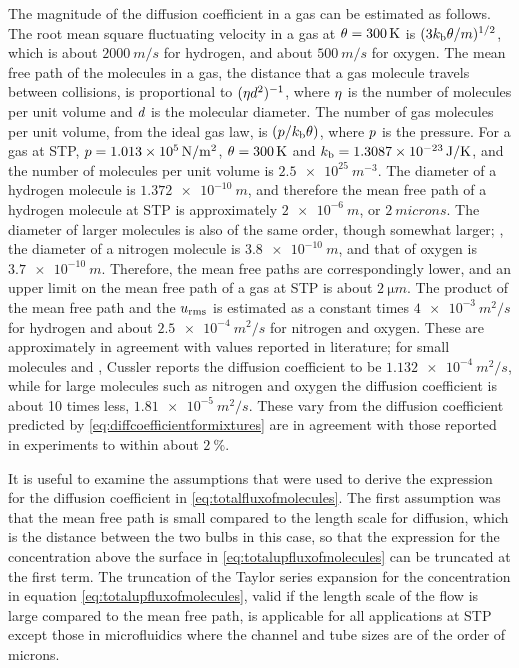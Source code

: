The magnitude of the diffusion coefficient in a gas can be estimated as follows. The root mean square fluctuating velocity in a gas at $\theta = \SI{300}{K}$ is $(3k_\text{b}\theta/m)^{1/2}$, which is about $\SI{2000}{m/s}$ for hydrogen, and about $\SI{500}{m/s}$ for oxygen. The mean free path of the molecules in a gas, the distance that a gas molecule travels between collisions, is proportional to $(\eta d^2)^{-1}$, where $\eta$ is the number of molecules per unit volume and $d$ is the molecular diameter. The number of gas molecules per unit volume, from the ideal gas law, is $(p/k_\text{b}\theta)$, where $p$ is the pressure. For a gas at STP, $p = \SI{1.013e5}{N/m^2}$, $\theta = \SI{300}{K}$ and $k_\text{b} = \SI{1.3087e-23}{J/K}$, and the number of molecules per unit volume is $\SI{2.5e25}{m^{-3}}$. The diameter of a hydrogen molecule is $\SI{1.372e-10}{m}$, and therefore the mean free path of a hydrogen molecule at STP is approximately $\SI{2e-6}{m}$, or $\SI{2}{microns}$. The diameter of larger molecules is also of the same order, though somewhat larger; \eg, the diameter of a nitrogen molecule is $\SI{3.8e-10}{m}$, and that of oxygen is $\SI{3.7e-10}{m}$. Therefore, the mean free paths are correspondingly lower, and an upper limit on the mean free path of a gas at STP is about $\SI{2}{\micro m}$. The product of the mean free path and the $u_\text{rms}$ is estimated as a constant times $\SI{4e-3}{m^2/s}$ for hydrogen and about $\SI{2.5e-4}{m^2/s}$ for nitrogen and oxygen. These are approximately in agreement with values reported in literature; for small molecules  and , Cussler reports the diffusion coefficient to be $\SI{1.132e-4}{m^2/s}$, while for large molecules such as nitrogen and oxygen the diffusion coefficient is about 10 times less, $\SI{1.81e-5}{m^2/s}$. These vary from the diffusion coefficient predicted by \cref{eq:diffcoefficientformixtures} are in agreement with those reported in experiments to within about $\SI{2}{\%}$.

It is useful to examine the assumptions that were used to derive the expression for the diffusion coefficient in \cref{eq:totalfluxofmolecules}. The first assumption was that the mean free path is small compared to the length scale for diffusion, which is the distance between the two bulbs in this case, so that the expression for the concentration above the surface in \cref{eq:totalupfluxofmolecules} can be truncated at the first term. The truncation of the Taylor series expansion for the concentration in equation \cref{eq:totalupfluxofmolecules}, valid if the length scale of the flow is large compared to the mean free path, is applicable for all applications at STP except those in microfluidics where the channel and tube sizes are of the order of microns.


